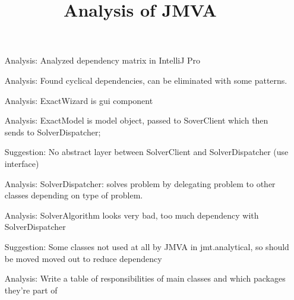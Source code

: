 \documentclass[11pt]{amsart}
\title{Analysis of JMVA}
\begin{document}
\maketitle
\begin{itemize}
\item[Analysis:] Analyzed dependency matrix in IntelliJ Pro
\item[Analysis:] Found cyclical dependencies, can be eliminated with some patterns.
\item[Analysis:] ExactWizard is gui component
\item[Analysis:] ExactModel is model object, passed to SoverClient which then sends to SolverDispatcher;
\item[Suggestion:] No abstract layer between SolverClient and SolverDispatcher (use interface)
\item[Analysis:] SolverDispatcher: solves problem by delegating problem to other classes depending on type of problem.
\item[Analysis:] SolverAlgorithm looks very bad, too much dependency with SolverDispatcher
\item[Suggestion:] Some classes not used at all by JMVA in jmt.analytical, so should be moved moved out to reduce dependency
\item[Analysis:] Write a table of responsibilities of main classes and which packages they're part of
\end{itemize}
\end{document}
